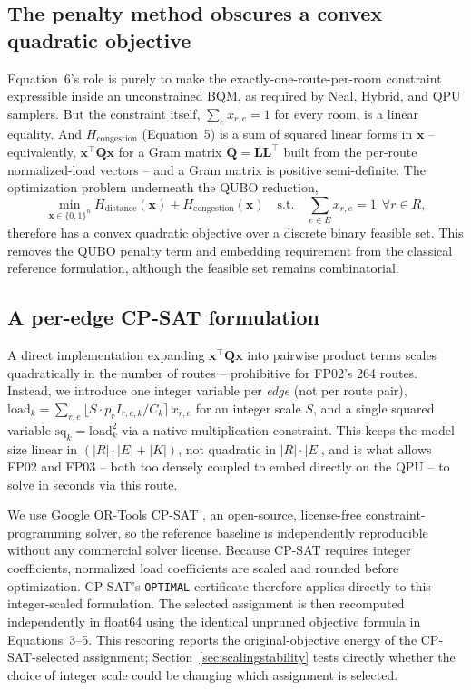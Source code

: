 \documentclass[11pt]{article}
\begin{document}
\subsection{The penalty method obscures a convex quadratic objective}
Equation~6's role is purely to make the exactly-one-route-per-room constraint expressible inside an unconstrained BQM, as required by Neal, Hybrid, and QPU samplers. But the constraint itself, $\sum_{e} x_{r,e} = 1$ for every room, is a linear equality. And $H_{\text{congestion}}$ (Equation~5) is a sum of squared linear forms in $\mathbf{x}$ -- equivalently, $\mathbf{x}^\top \mathbf{Q} \mathbf{x}$ for a Gram matrix $\mathbf{Q} = \mathbf{L}\mathbf{L}^\top$ built from the per-route normalized-load vectors -- and a Gram matrix is positive semi-definite. The optimization problem underneath the QUBO reduction,
\begin{equation}
\min_{\mathbf{x} \in \{0,1\}^n} H_{\text{distance}}(\mathbf{x}) + H_{\text{congestion}}(\mathbf{x}) \quad \text{s.t.} \quad \sum_{e \in E} x_{r,e} = 1 \ \ \forall r \in R, \tag{8}
\end{equation}
therefore has a convex quadratic objective over a discrete binary feasible set. This removes the QUBO penalty term and embedding requirement from the classical reference formulation, although the feasible set remains combinatorial.

\subsection{A per-edge CP-SAT formulation}
A direct implementation expanding $\mathbf{x}^\top\mathbf{Q}\mathbf{x}$ into pairwise product terms scales quadratically in the number of routes -- prohibitive for FP02's 264 routes. Instead, we introduce one integer variable per \emph{edge} (not per route pair), $\text{load}_k = \sum_{r,e} \lfloor S \cdot p_r I_{r,e,k} / C_k \rceil\, x_{r,e}$ for an integer scale $S$, and a single squared variable $\text{sq}_k = \text{load}_k^2$ via a native multiplication constraint. This keeps the model size linear in $(|R|\cdot|E| + |K|)$, not quadratic in $|R|\cdot|E|$, and is what allows FP02 and FP03 -- both too densely coupled to embed directly on the QPU -- to solve in seconds via this route.

We use Google OR-Tools CP-SAT \cite{ortools}, an open-source, license-free constraint-programming solver, so the reference baseline is independently reproducible without any commercial solver license. Because CP-SAT requires integer coefficients, normalized load coefficients are scaled and rounded before optimization. CP-SAT's \texttt{OPTIMAL} certificate therefore applies directly to this integer-scaled formulation. The selected assignment is then recomputed independently in float64 using the identical unpruned objective formula in Equations~3--5. This rescoring reports the original-objective energy of the CP-SAT-selected assignment; Section~\ref{sec:scalingstability} tests directly whether the choice of integer scale could be changing which assignment is selected.
\end{document}
